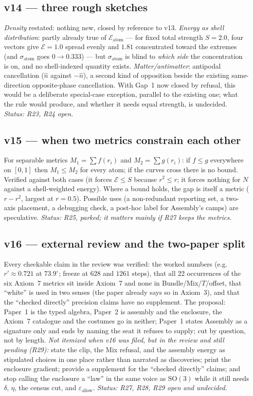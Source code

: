 \documentclass[11pt]{article}
\begin{document}
\subsection*{v14 --- three rough sketches}
\emph{Density} restated: nothing new, closed by reference to v13.
\emph{Energy as shell distribution}: partly already true of
$\mathcal{E}_{\text{atom}}$ --- for fixed total strength $S=2.0$,
four vectors give $\mathcal{E}=1.0$ spread evenly and $1.81$
concentrated toward the extremes (and $\sigma_{\text{atom}}$ goes
$0\to0.333$) --- but $\sigma_{\text{atom}}$ is blind to \emph{which
side} the concentration is on, and no shell-indexed quantity exists.
\emph{Matter/antimatter}: antipodal cancellation ($\hat n$ against
$-\hat n$), a second kind of opposition beside the existing
same-direction opposite-phase cancellation. With Gap~1 now closed by
refusal, this would be a deliberate special-case exception, parallel
to the existing one; what the rule would produce, and whether it
needs equal strength, is undecided.
\emph{Status: R23, R24 open.}

\subsection*{v15 --- when two metrics constrain each other}
For separable metrics $M_1=\sum f(r_i)$ and $M_2=\sum g(r_i)$: if
$f\le g$ everywhere on $[0,1]$ then $M_1\le M_2$ for every atom;
if the curves cross there is no bound. Verified against both cases
(it forces $\mathcal{E}\le S$ because $r^2\le r$; it forces nothing
for $N$ against a shell-weighted energy). Where a bound holds, the
gap is itself a metric ($r-r^2$, largest at $r=0.5$). Possible uses
(a non-redundant reporting set, a two-axis placement, a debugging
check, a post-hoc label for Assembly's camps) are speculative.
\emph{Status: R25, parked; it matters mainly if R27 keeps the
metrics.}

\subsection*{v16 --- external review and the two-paper split}
Every checkable claim in the review was verified: the worked
numbers (e.g.\ $r'\approx0.721$ at $73.9^\circ$; freeze at $628$ and
$1261$ steps), that all 22 occurrences of the six Axiom~7 metrics sit
inside Axiom~7 and none in Bundle/Mix/$T$/offset, that ``white'' is
used in two senses (the paper already says so in Axiom~3), and that
the ``checked directly'' precision claims have no supplement.
The proposal: Paper~1 is the typed algebra, Paper~2 is assembly and
the enclosure, the Axiom~7 catalogue and the costumes go in neither;
Paper~1 states Assembly as a signature only and ends by naming the
seat it refuses to supply; cut by question, not by length.
\emph{Not itemized when v16 was filed, but in the review and still
pending (R29):} state the clip, the Mix refusal, and the assembly
energy as stipulated choices in one place rather than narrated as
discoveries; print the enclosure gradient; provide a supplement for
the ``checked directly'' claims; and stop calling the enclosure a
``law'' in the same voice as $\mathrm{SO}(3)$ while it still needs
$\delta$, $\eta$, the census cut, and $\varepsilon_{\text{allow}}$.
\emph{Status: R27, R28, R29 open and undecided.}
\end{document}

